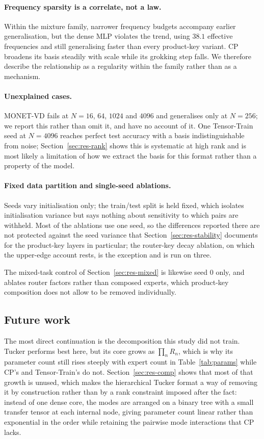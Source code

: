 \paragraph{Frequency sparsity is a correlate, not a law.} Within the mixture
family, narrower frequency budgets accompany earlier generalisation, but the
dense MLP violates the trend, using $38.1$ effective frequencies and still
generalising faster than every product-key variant. CP broadens its basis
steadily with scale while its grokking step falls. We therefore describe the
relationship as a regularity within the family rather than as a mechanism.

\paragraph{Unexplained cases.} MONET-VD fails at $N = 16$, $64$, $1024$ and
$4096$ and generalises only at $N = 256$; we report this rather than omit it,
and have no account of it. One Tensor-Train seed at $N = 4096$ reaches perfect test accuracy with a basis
indistinguishable from noise; Section~\ref{sec:res-rank} shows this is
systematic at high rank and is most likely a limitation of how we extract the
basis for this format rather than a property of the model.

\paragraph{Fixed data partition and single-seed ablations.} Seeds vary
initialisation only; the train/test split is held fixed, which isolates
initialisation variance but says nothing about sensitivity to which pairs are
withheld. Most of the ablations use one seed, so the differences reported there are not
protected against the seed variance that Section~\ref{sec:res-stability}
documents for the product-key layers in particular; the router-key decay ablation, on which the upper-edge account rests, is the exception and is run on three.

The mixed-task control of Section~\ref{sec:res-mixed} is likewise seed $0$
only, and ablates router factors rather than composed experts, which
product-key composition does not allow to be removed individually.

\subsection{Future work}
\label{sec:future}

The most direct continuation is the decomposition this study did not train.
Tucker performs best here, but its core grows as $\prod_n R_n$, which is why
its parameter count still rises steeply with expert count in
Table~\ref{tab:params} while CP's and Tensor-Train's do not.
Section~\ref{sec:res-comp} shows that most of that growth is unused, which
makes the hierarchical Tucker format \citep{grasedyck2010hierarchical} a way of
removing it by construction rather than by a rank constraint imposed after the
fact: instead of one dense core, the modes are arranged on a binary tree with a
small transfer tensor at each internal node, giving parameter count linear
rather than exponential in the order while retaining the pairwise mode
interactions that CP lacks.

